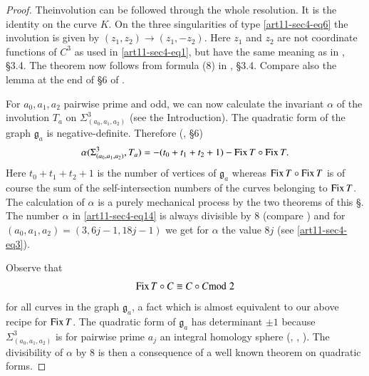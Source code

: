 \begin{proof}
The\pageoriginale involution can be followed through the whole resolution. It is the identity on the curve $K$. On the three singularities of type \eqref{art11-sec4-eq6} the involution is given by $(z_{1},z_{2})\to (z_{1},-z_{2})$. Here $z_{1}$ and $z_{2}$ are not coordinate functions of $C^{3}$ as used in \eqref{art11-sec4-eq1}, but have the same meaning as in \cite{art11-key6}, \S3.4. The theorem now follows from formula (8) in \cite{art11-key6}, \S3.4. Compare also the lemma at the end of \S6 of \cite{art11-key7}.

For $a_{0},a_{1},a_{2}$ pairwise prime and odd, we can now calculate the invariant $\alpha$ of the involution $T_{a}$ on $\Sigma^{3}_{(a_{0},a_{1},a_{2})}$ (see the Introduction). The quadratic form of the graph $\mathfrak{g}_{a}$ is negative-definite. Therefore (\cite{art11-key7}, \S6)
\begin{equation}
\alpha(\Sigma^{3}_{(a_{0},a_{1},a_{2})},T_{a})=-(t_{0}+t_{1}+t_{2}+1)-\operatorname{\mathrm{Fix}} T\circ \operatorname{\mathrm{Fix}} T.\label{art11-sec4-eq14}
\end{equation}
Here $t_{0}+t_{1}+t_{2}+1$ is the number of vertices of $\mathfrak{g}_{a}$ whereas $\operatorname{\mathrm{Fix}} T\circ \operatorname{\mathrm{Fix}} T$ is of course the sum of the self-intersection numbers of the curves belonging to $\operatorname{\mathrm{Fix}} T$. The calculation of $\alpha$ is a purely mechanical process by the two theorems of this \S. The number $\alpha$ in \eqref{art11-sec4-eq14} is always divisible by 8 (compare \cite{art11-key7}) and for $(a_{0},a_{1},a_{2})=(3,6j-1,18j-1)$ we get for $\alpha$ the value $8j$ (see \eqref{art11-sec4-eq3}).

Observe that
\begin{equation}
\operatorname{\mathrm{Fix}} T\circ C\equiv C\circ C{\rm{mod}}\kern.3em 2\label{art11-sec4-eq15}
\end{equation}
for all curves in the graph $\mathfrak{g}_{a}$, a fact which is almost equivalent to our above recipe for $\operatorname{\mathrm{Fix}} T$. The quadratic form of $\mathfrak{g}_{a}$ has determinant $\pm 1$ because $\Sigma^{3}_{(a_{0},a_{1},a_{2})}$ is for pairwise prime $a_{j}$ an integral homology sphere (\cite{art11-key1}, \cite{art11-key2}, \cite{art11-key7}). The divisibility of $\alpha$ by 8 is then a consequence of a well known theorem on quadratic forms.


\end{proof}
